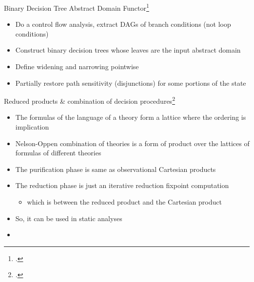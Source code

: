 \documentclass[aspectratio=169,notes]{beamer}
\begin{document}
\begin{frame}{Binary Decision Tree Abstract Domain Functor\footcite{chen2015binary}}
  \begin{itemize}[<+->]
  \item Do a control flow analysis, extract DAGs of branch conditions (not loop conditions)
  \item Construct binary decision trees whose leaves are the input abstract domain
  \item Define widening and narrowing pointwise
  \item Partially restore path sensitivity (disjunctions) for some portions of the state
  \end{itemize}
\end{frame}

\begin{frame}{Reduced products \& combination of decision procedures\footcite{cousot2011reduced}}
  \footnotesize
  \begin{itemize}
  \item The formulas of the language of a theory form a lattice where the ordering is implication
  \item Nelson-Oppen combination of theories is a form of product over the lattices of formulas of different theories
  \item The purification phase is same as observational Cartesian products
  \item The reduction phase is just an iterative reduction fixpoint computation
    \begin{itemize}
    \item which is between the reduced product and the Cartesian product
    \end{itemize}
  \item So, it can be used in static analyses
  \item {}
  \end{itemize}
\end{frame}
\end{document}
